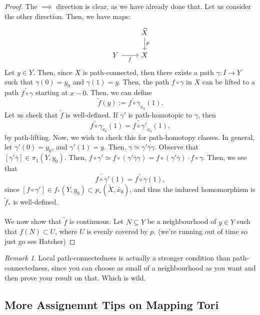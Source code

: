 \documentclass[a4paper]{report}
\theoremstyle{definition}
\theoremstyle{remark}
\newtheorem{remark}{Remark}
\theoremstyle{proposition}
\theoremstyle{conjecture}
\theoremstyle{lemma}
\theoremstyle{corollary}
\theoremstyle{exercise}
\begin{document}
\begin{proof}
    The $\implies$ direction is clear, as we have already done that.
    Let us consider the other direction. Then, we have maps:
    $$\begin{tikzcd}
        & \widetilde{X} \arrow[d, "p"] \\
Y \arrow[r, "f"'] & X                           
\end{tikzcd}$$
    Let $y\in Y$. Then, since $X$ is path-connected, then 
    there exists a path $\gamma : I \to Y$ such that $\gamma(0) = y_0$
    and $\gamma(1) = y$.
    Then, the path $f\circ \gamma$ in $X$ can be lifted to a path 
    $\widetilde{f\circ \gamma}$ starting at $x-0$. Then, we can define 
    $$\widetilde{f}(y) := \widetilde{f\circ \gamma}_{x_0}(1).$$
    Let us check that $\widetilde{f}$ is well-defined. 
    If $\gamma'$ is path-homotopic to $\gamma$, then 
    $$\widetilde{f\circ \gamma}_{x_0}(1) = \widetilde{f \circ \gamma'}_{x_0}(1),$$
    by path-lifting.
    Now, we wish to check this for path-homotopy classes. 
    In general, let $\gamma'(0) = y_0$, and $\gamma'(1) = y$.
    Then, $\gamma \simeq \gamma' \overline{\gamma}\gamma$.
    Observe that $[\gamma'\overline{\gamma}] \in \pi_1(Y,y_0)$.
    Then, $f\circ \gamma' \simeq f\circ (\gamma' \overline{\gamma}\gamma) = f\circ (\gamma' \overline{\gamma}) \cdot f\circ \gamma$.
    Then, we see that $$\widetilde{f\circ \gamma'}(1) = \widetilde{f\circ \gamma}(1),$$
    since $[f\circ \gamma'] \in f_\ast(Y,y_0) \subset p_\ast(\widetilde{X},\widetilde{x_0})$,
    and thus the induced homomorphism is $\widetilde{f}_\ast$ is well-defined.\\\\
    We now show that $\widetilde{f}$ is continuous. Let $N\subseteq Y$ be a neighbourhood of 
    $y \in Y$ such that $f(N) \subset U$, where $U$ is evenly covered by $p$.
    (we're running out of time so just go see Hatcher)
\end{proof}

\begin{remark}
    Local path-connectedness is actually a stronger condition than path-connectedness, 
    since you can choose as small of a neighbourhood as you want 
    and then prove your result on that. Which is wild.
\end{remark}

\subsection{More Assignemnt Tips on Mapping Tori}
\end{document}
